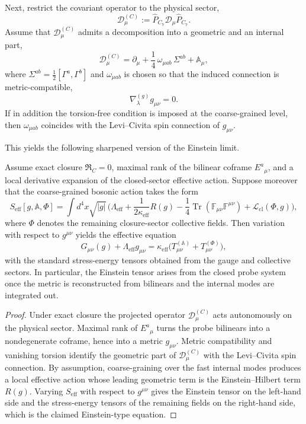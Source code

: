Next, restrict the covariant operator to the physical sector,
\[
  \mathcal D^{(C)}_\mu := \hat P_{C_7}\mathcal D_\mu \hat P_{C_7}.
\]
Assume that $\mathcal D^{(C)}_\mu$ admits a decomposition into a geometric and an
internal part,
\[
  \mathcal D^{(C)}_\mu
  = \partial_\mu + \frac14 \, \omega_{\mu ab}\,\Sigma^{ab} + \mathbb A_\mu,
\]
where $\Sigma^{ab}=\frac12[\Gamma^a,\Gamma^b]$ and $\omega_{\mu ab}$ is chosen so
that the induced connection is metric-compatible,
\[
  \nabla^{(g)}_\lambda g_{\mu\nu}=0.
\]
If in addition the torsion-free condition is imposed at the coarse-grained
level, then $\omega_{\mu ab}$ coincides with the Levi--Civita spin connection of
$g_{\mu\nu}$.

This yields the following sharpened version of the Einstein limit.

\begin{proposition}
\label{prop:bilinear-einstein-reconstruction}
Assume exact closure $\mathfrak R_C=0$, maximal rank of the bilinear coframe
$E^a{}_{\mu}$, and a local derivative expansion of the closed-sector effective
action. Suppose moreover that the coarse-grained bosonic action takes the form
\[
  S_{\mathrm{eff}}[g,\mathbb A,\Phi]
  = \int d^4x\sqrt{|g|}\,\bigl(
      \Lambda_{\mathrm{eff}}
      + \frac{1}{2\kappa_{\mathrm{eff}}}R(g)
      - \frac14\operatorname{Tr}(\mathbb F_{\mu\nu}\mathbb F^{\mu\nu})
      + \mathcal L_{\mathrm{cl}}(\Phi,g)
    \bigr),
\]
where $\Phi$ denotes the remaining closure-sector collective fields.
Then variation with respect to $g^{\mu\nu}$ yields the effective equation
\[
  G_{\mu\nu}(g) + \Lambda_{\mathrm{eff}}g_{\mu\nu}
  = \kappa_{\mathrm{eff}}
    \bigl(T^{(\mathbb A)}_{\mu\nu} + T^{(\Phi)}_{\mu\nu}\bigr),
\]
with the standard stress-energy tensors obtained from the gauge and collective
sectors. In particular, the Einstein tensor arises from the closed probe
system once the metric is reconstructed from bilinears and the internal modes
are integrated out.
\end{proposition}

\begin{proof}
Under exact closure the projected operator $\mathcal D^{(C)}_\mu$ acts
autonomously on the physical sector. Maximal rank of $E^a{}_{\mu}$ turns the
probe bilinears into a nondegenerate coframe, hence into a metric
$g_{\mu\nu}$. Metric compatibility and vanishing torsion identify the geometric
part of $\mathcal D^{(C)}_\mu$ with the Levi--Civita spin connection.
By assumption, coarse-graining over the fast internal modes produces a local
effective action whose leading geometric term is the Einstein--Hilbert term
$R(g)$. Varying $S_{\mathrm{eff}}$ with respect to $g^{\mu\nu}$ gives the Einstein
tensor on the left-hand side and the stress-energy tensors of the remaining
fields on the right-hand side, which is the claimed Einstein-type equation.
\end{proof}

